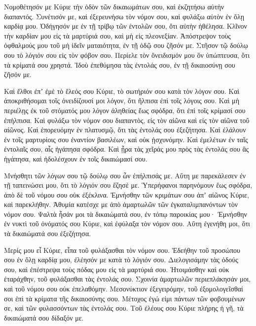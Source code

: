 {\par }{\PP {}Νομοθέτησόν με Κύριε τὴν ὁδὸν τῶν δικαιωμάτων σου, καὶ ἐκζητήσω αὐτὴν διαπαντός.
Συνέτισόν με, καὶ ἐξερευνήσω τὸν νόμον σου, καὶ φυλάξω αὐτὸν ἐν ὅλῃ καρδίᾳ μου.
Ὁδήγησόν με ἐν τῇ τρίβῳ τῶν ἐντολῶν σου, ὅτι αὐτὴν ἠθέλησα.
Κλῖνον τὴν καρδίαν μου εἰς τὰ μαρτύριά σου, καὶ μὴ εἰς πλεονεξίαν.
Ἀπόστρεψον τοὺς ὀφθαλμούς μου τοῦ μὴ ἰδεῖν ματαιότητα, ἐν τῇ ὁδῷ σου ζῆσόν με.
Στῆσον τῷ δούλῳ σου τὸ λόγιόν σου εἰς τὸν φόβον σου.
Περίελε τὸν ὄνειδισμόν μου ὃν ὑπώπτευσα, ὅτι τὰ κρίματά σου χρηστά.
Ἰδοὺ ἐπεθύμησα τὰς ἐντολάς σου, ἐν τῇ δικαιοσύνῃ σου ζῆσόν με.
\par }{\PP {}Καὶ ἔλθοι ἐπʼ ἐμὲ τὸ ἔλεός σου Κύριε, τὸ σωτήριόν σου κατὰ τὸν λόγον σου.
Καὶ ἀποκριθήσομαι τοῖς ὀνειδίζουσί μοι λόγον, ὅτι ἤλπισα ἐπὶ τοῖς λόγοις σου.
Καὶ μὴ περιέλῃς ἐκ τοῦ στόματός μου λόγον ἀληθείας ἕως σφόδρα, ὅτι ἐπὶ τοῖς κρίμασί σου ἐπήλπισα.
Καὶ φυλάξω τὸν νόμον σου διαπαντὸς, εἰς τὸν αἰῶνα καὶ εἰς τὸν αἰῶνα τοῦ αἰῶνος.
Καὶ ἐπορευόμην ἐν πλατυσμῷ, ὅτι τὰς ἐντολάς σου ἐξεζήτησα.
Καὶ ἐλάλουν ἐν τοῖς μαρτυρίοις σου ἐναντίον βασιλέων, καὶ οὐκ ᾐσχυνόμην.
Καὶ ἐμελέτων ἐν ταῖς ἐντολαῖς σου, αἷς ἠγάπησα σφόδρα.
Καὶ ᾖρα τὰς χεῖράς μου πρὸς τὰς ἐντολάς σου ἃς ἠγάπησα, καὶ ἠδολέσχουν ἐν τοῖς δικαιώμασί σου.
\par }{\PP {}Μνήσθητι τῶν λόγων σου τῷ δούλῳ σου ὧν ἐπήλπισάς με.
Αὕτη με παρεκάλεσεν ἐν τῇ ταπεινώσει μου, ὅτι τὸ λόγιόν σου ἔζησέ με.
Ὑπερήφανοι παρηνόμουν ἕως σφόδρα, ἀπὸ δὲ τοῦ νόμου σου οὐκ ἐξέκλινα.
Ἐμνήσθην τῶν κριμάτων σου ἀπʼ αἰῶνος Κύριε, καὶ παρεκλήθην.
Ἀθυμία κατέσχε με ἀπὸ ἁμαρτωλῶν τῶν ἐγκαταλιμπανόντων τὸν νόμον σου.
Ψαλτὰ ἦσάν μοι τὰ δικαιώματά σου, ἐν τόπῳ παροικίας μου·
Ἐμνήσθην ἐν νυκτὶ τοῦ ὀνόματός σου Κύριε, καὶ ἐφύλαξα τὸν νόμον σου.
Αὕτη ἐγενήθη μοι, ὅτι τὰ δικαιώματά σου ἐξεζήτησα.
\par }{\PP {}Μερίς μου εἶ Κύριε, εἶπα τοῦ φυλάξασθαι τὸν νόμον σου.
Ἐδεήθην τοῦ προσώπου σου ἐν ὅλῃ καρδίᾳ μου, ἐλέησόν με κατὰ τὸ λόγιόν σου.
Διελογισάμην τὰς ὁδούς σου, καὶ ἐπέστρεψα τοὺς πόδας μου εἰς τὰ μαρτύριά σου.
Ἡτοιμάσθην καὶ οὐκ ἐταράχθην, τοῦ φυλάξασθαι τὰς ἐντολάς σου.
Σχοινία ἁμαρτωλῶν περιεπλάκησάν μοι, καὶ τοῦ νόμου σου οὐκ ἐπελαθόμην.
Μεσονύκτιον ἐξεγειρόμην, τοῦ ἐξομολογεῖσθαί σοι ἐπὶ τὰ κρίματα τῆς δικαιοσύνης σου.
Μέτοχος ἐγώ εἰμι πάντων τῶν φοβουμένων σε, καὶ τῶν φυλασσόντων τὰς ἐντολάς σου.
Τοῦ ἐλέους σου Κύριε πλήρης ἡ γῆ, τὰ δικαιώματά σου δίδαξόν με.
}

